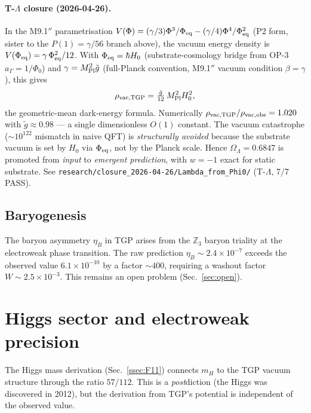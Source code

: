 \documentclass[aps,prd,twocolumn,superscriptaddress,showpacs,
  nofootinbib,floatfix,longbibliography]{revtex4-2}
\newcommand{\OL}{\Omega_\Lambda}
\newcommand{\ZZ}{\mathbb{Z}}
\begin{document}
\paragraph{T-$\Lambda$ closure (2026-04-26).}
In the M9.1$''$ parametrisation $V(\Phi) = (\gamma/3)\Phi^3/\Phi_{\rm eq} - (\gamma/4)\Phi^4/\Phi_{\rm eq}^2$
(P2 form, sister to the $P(1) = \gamma/56$ branch above), the vacuum
energy density is $V(\Phi_{\rm eq}) = \gamma\,\Phi_{\rm eq}^2/12$. With
$\Phi_{\rm eq} = \hbar H_0$ (substrate-cosmology bridge from OP-3 $a_\Gamma = 1/\Phi_0$)
and $\gamma = M_{\rm Pl}^2 \tilde g$ (full-Planck convention, M9.1$''$
vacuum condition $\beta = \gamma$), this gives
\[
  \rho_{\rm vac,TGP} = \tfrac{\tilde g}{12}\,M_{\rm Pl}^2 H_0^2,
\]
the geometric-mean dark-energy formula. Numerically
$\rho_{\rm vac,TGP}/\rho_{\rm vac,obs} = 1.020$ with $\tilde g \approx 0.98$ —
a single dimensionless $O(1)$ constant. The vacuum catastrophe
($\sim 10^{122}$ mismatch in naive QFT) is \emph{structurally avoided}
because the substrate vacuum is set by $H_0$ via $\Phi_{\rm eq}$, not by
the Planck scale. Hence $\OL = 0.6847$ is promoted from \emph{input} to
\emph{emergent prediction}, with $w = -1$ exact for static substrate.
See \texttt{research/closure\_2026-04-26/Lambda\_from\_Phi0/} (T-$\Lambda$,
7/7 PASS).


\subsection{Baryogenesis}\label{ssec:baryogenesis}

The baryon asymmetry $\eta_B$ in TGP arises from the $\ZZ_3$ baryon
triality at the electroweak phase transition. The raw prediction
$\eta_B \sim 2.4 \times 10^{-7}$ exceeds the observed value
$6.1 \times 10^{-10}$ by a factor $\sim 400$, requiring a washout
factor $W \sim 2.5 \times 10^{-3}$. This remains an open problem
(Sec.~\ref{sec:open}).


\section{Higgs sector and electroweak precision}\label{sec:higgs}

The Higgs mass derivation (Sec.~\ref{ssec:F11}) connects $m_H$ to
the TGP vacuum structure through the ratio $57/112$. This is a
\emph{post}diction (the Higgs was discovered in 2012), but the
derivation from TGP's potential is independent of the observed value.
\end{document}
